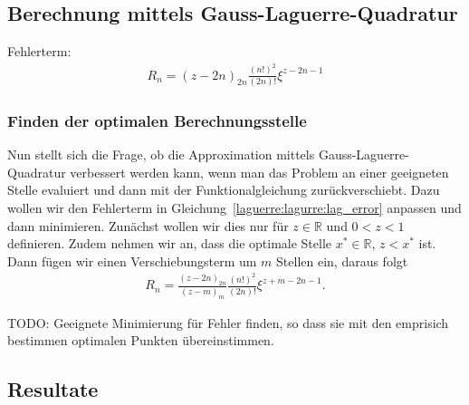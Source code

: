 \subsection{Berechnung mittels Gauss-Laguerre-Quadratur}

Fehlerterm:
\begin{align*}
R_n
=
(z - 2n)_{2n} \frac{(n!)^2}{(2n)!} \xi^{z-2n-1}
\end{align*}

\subsubsection{Finden der optimalen Berechnungsstelle}
Nun stellt sich die Frage,
ob die Approximation mittels Gauss-Laguerre-Quadratur verbessert werden kann,
wenn man das Problem an einer geeigneten Stelle evaluiert und
dann mit der Funktionalgleichung zurückverschiebt.
Dazu wollen wir den Fehlerterm in
Gleichung~\eqref{laguerre:lagurre:lag_error} anpassen und dann minimieren.
Zunächst wollen wir dies nur für $z\in \mathbb{R}$ und $0<z<1$ definieren.
Zudem nehmen wir an, dass die optimale Stelle $x^* \in \mathbb{R}$, $z < x^*$
ist.
Dann fügen wir einen Verschiebungsterm um $m$ Stellen ein, daraus folgt
\begin{align*}
R_n
=
\frac{(z - 2n)_{2n}}{(z - m)_m} \frac{(n!)^2}{(2n)!} \xi^{z + m - 2n - 1}
.
\end{align*}

{
\large \color{red}
TODO:
Geeignete Minimierung für Fehler finden, so dass sie mit den emprisich
bestimmen optimalen Punkten übereinstimmen.
}

\subsection{Resultate}
